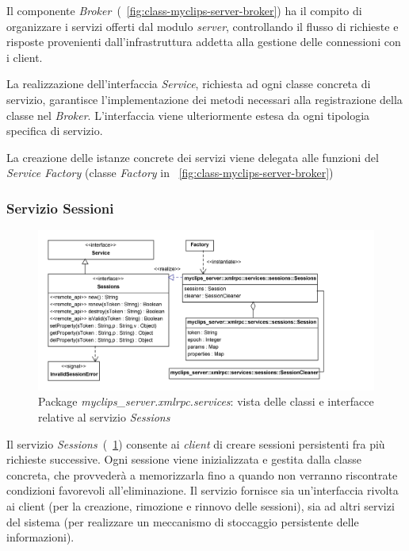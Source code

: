 Il componente \emph{Broker}~(\figurename~\ref{fig:class-myclips-server-broker}) ha il compito di organizzare i servizi offerti dal modulo \emph{server}, controllando il flusso di richieste e risposte provenienti dall'infrastruttura addetta alla gestione delle connessioni con i client.

La realizzazione dell'interfaccia \emph{Service}, richiesta ad ogni classe concreta di servizio, garantisce l'implementazione dei metodi necessari alla registrazione della classe nel \emph{Broker}. L'interfaccia viene ulteriormente estesa da ogni tipologia specifica di servizio.

La creazione delle istanze concrete dei servizi viene delegata alle funzioni del \emph{Service Factory} (classe \emph{Factory} in \figurename~\ref{fig:class-myclips-server-broker})

\subsubsection{Servizio Sessioni}

\begin{figure}
\centering
\includegraphics[width=1\textwidth]{Immagini/Capitolo3/Classi/myclips_server_services_Sessions.png}
\caption{Package \emph{myclips\_server.xmlrpc.services}: vista delle classi e interfacce relative al servizio \emph{Sessions}}\label{fig:class-myclips-server-services-sessions}
\end{figure}

Il servizio \emph{Sessions}~(\figurename~\ref{fig:class-myclips-server-services-sessions}) consente ai \emph{client} di creare sessioni persistenti fra più richieste successive. Ogni sessione viene inizializzata e gestita dalla classe concreta, che provvederà a memorizzarla fino a quando non verranno riscontrate condizioni favorevoli all'eliminazione.
Il servizio fornisce sia un'interfaccia rivolta ai client (per la creazione, rimozione e rinnovo delle sessioni), sia ad altri servizi del sistema (per realizzare un meccanismo di stoccaggio persistente delle informazioni).


